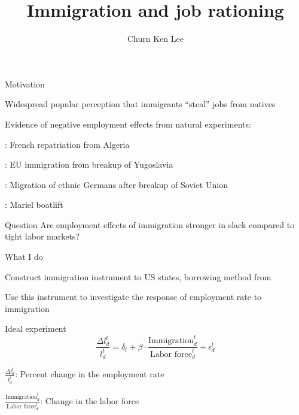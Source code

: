 \documentclass[aspectratio=169]{beamer}
\title{Immigration and job rationing}
\subtitle{}
\author{Churn Ken Lee}
\institute{UC San Diego}
\date{}
\newenvironment{wideitemize}{\itemize\addtolength{\itemsep}{10pt}}{\enditemize}
\begin{document}
\begin{frame}
    \frametitle{}

    \titlepage

\end{frame}

\begin{frame}{Motivation}
    \begin{wideitemize}
        \item Widespread popular perception that immigrants ``steal'' jobs from natives
        \item Evidence of negative employment effects from natural experiments:
        \begin{wideitemize}
            \item \textcite{hunt_ILRReview_1992_algerian_repatriates_french_labor_market}: French repatriation from Algeria
            \item \textcite{angrist_kugler_EJ_2003_yugoslovia_immigration}: EU immigration from breakup of Yugoslavia
            \item \textcite{glits_JOLE_2012_soviet_german_immigrants_allocation_rule}: Migration of ethnic Germans after breakup of Soviet Union
            \item \textcite{card_ILRReview_1990_mariel_boatlift}: Mariel boatlift
        \end{wideitemize}
    \end{wideitemize}
\end{frame}

\begin{frame}{Question}
    Are employment effects of immigration stronger in slack compared to tight labor markets?
\end{frame}

\begin{frame}{What I do}
    \begin{wideitemize}
        \item Construct immigration instrument to US states, borrowing method from \textcite{burchardi_chaney_hassan_tarquinio_terry_NBERWP_2020_immigration_innovation}
        \item Use this instrument to investigate the response of employment rate to immigration
    \end{wideitemize}
\end{frame}

\begin{frame}{Ideal experiment}
    \begin{equation*}
        \frac{\Delta l_d^t}{l_d^t} = \delta_t + \beta \cdot \frac{\text{Immigration}_d^t}{\text{Labor force}_d^t} + \epsilon_d^t
    \end{equation*}
    \begin{wideitemize}
        \item $\frac{\Delta l_d^t}{l_d^t}$: Percent change in the employment rate
        \item $\frac{\text{Immigration}_d^t}{\text{Labor force}_d^t}$: Change in the labor force
    \end{wideitemize}
\end{frame}
\end{document}
